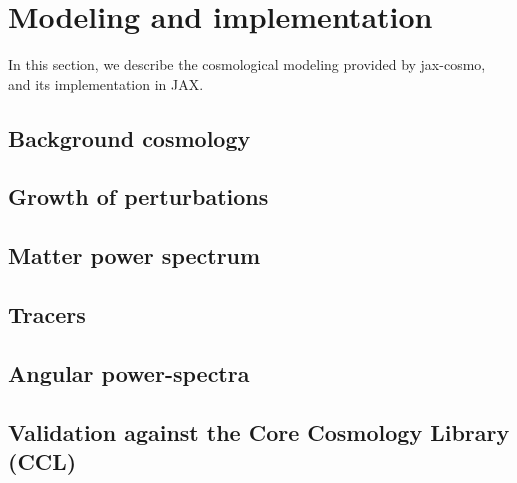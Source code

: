\documentclass[final,5p,times,twocolumn,authoryear]{elsarticle}
\begin{document}
\section{Modeling and implementation}
\label{sec-jaxcosmo-design}
In this section, we describe the cosmological modeling provided by jax-cosmo, and its implementation in JAX.




\subsection{Background cosmology}


\subsection{Growth of perturbations}


\subsection{Matter power spectrum}


\subsection{Tracers}


\subsection{Angular power-spectra}


\subsection{Validation against the Core Cosmology Library (CCL)} 
\end{document}
